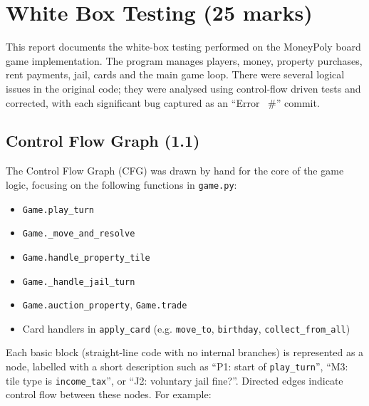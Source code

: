 \documentclass[11pt]{article}
\begin{document}
\section{White Box Testing (25 marks)}

This report documents the white-box testing performed on the MoneyPoly board game implementation. The program manages players, money, property purchases, rent payments, jail, cards and the main game loop. There were several logical issues in the original code; they were analysed using control-flow driven tests and corrected, with each significant bug captured as an ``Error~
#'' commit.

\subsection{Control Flow Graph (1.1)}

The Control Flow Graph (CFG) was drawn by hand for the core of the game logic, focusing on the following functions in \texttt{game.py}:

\begin{itemize}
  \item \texttt{Game.play\_turn}
  \item \texttt{Game.\_move\_and\_resolve}
  \item \texttt{Game.handle\_property\_tile}
  \item \texttt{Game.\_handle\_jail\_turn}
  \item \texttt{Game.auction\_property}, \texttt{Game.trade}
  \item Card handlers in \texttt{apply\_card} (e.g. \texttt{move\_to}, \texttt{birthday}, \texttt{collect\_from\_all})
\end{itemize}

Each basic block (straight-line code with no internal branches) is represented as a node, labelled with a short description such as ``P1: start of \texttt{play\_turn}'', ``M3: tile type is \texttt{income\_tax}'', or ``J2: voluntary jail fine?''. Directed edges indicate control flow between these nodes. For example:
\end{document}
